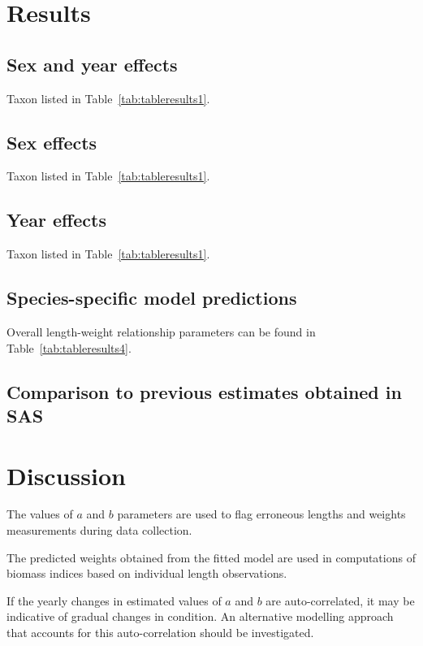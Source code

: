 \documentclass[12pt]{article}\usepackage[]{graphicx}\usepackage[]{color}
\begin{document}
\section{Results}\label{results}

\subsection{Sex and year effects}\label{sex-and-year-effects}

Taxon listed in Table~\ref{tab:tableresults1}.

\subsection{Sex effects}\label{sex-effects}

Taxon listed in Table~\ref{tab:tableresults1}.

\subsection{Year effects}\label{year-effects}

Taxon listed in Table~\ref{tab:tableresults1}.

\subsection{Species-specific model predictions}\label{species-specific-model-predictions}

Overall length-weight relationship parameters can be found in Table~\ref{tab:tableresults4}.

\subsection{Comparison to previous estimates obtained in SAS}\label{comparison-to-previous-estimates-obtained-in-sas}

\section{Discussion}\label{discussion}

The values of \(a\) and \(b\) parameters are used to flag erroneous lengths and weights measurements during data collection.

The predicted weights obtained from the fitted model are used in computations of biomass indices based on individual length observations.

If the yearly changes in estimated values of \(a\) and \(b\) are auto-correlated, it may be indicative of gradual changes in condition. An alternative modelling approach that accounts for this auto-correlation should be investigated.
\end{document}
